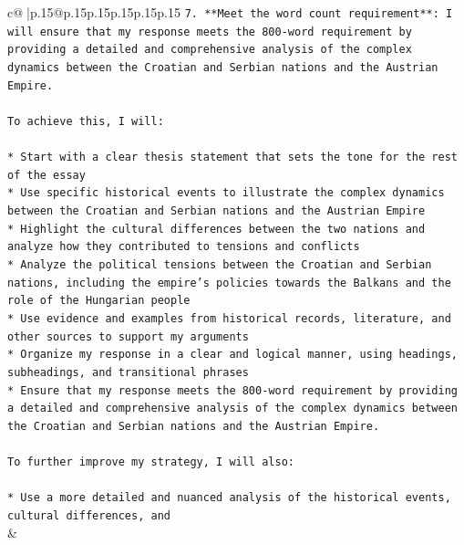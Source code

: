 \documentclass{article}
\begin{document}
{\begin{supertabular}{c@{$\;$}|p{.15\linewidth}@{}p{.15\linewidth}p{.15\linewidth}p{.15\linewidth}p{.15\linewidth}p{.15\linewidth}}
{{{\texttt{7. **Meet the word count requirement**: I will ensure that my response meets the 800{-}word requirement by providing a detailed and comprehensive analysis of the complex dynamics between the Croatian and Serbian nations and the Austrian Empire.} \\
\\ 
\texttt{To achieve this, I will:} \\
\\ 
\texttt{* Start with a clear thesis statement that sets the tone for the rest of the essay} \\
\texttt{* Use specific historical events to illustrate the complex dynamics between the Croatian and Serbian nations and the Austrian Empire} \\
\texttt{* Highlight the cultural differences between the two nations and analyze how they contributed to tensions and conflicts} \\
\texttt{* Analyze the political tensions between the Croatian and Serbian nations, including the empire's policies towards the Balkans and the role of the Hungarian people} \\
\texttt{* Use evidence and examples from historical records, literature, and other sources to support my arguments} \\
\texttt{* Organize my response in a clear and logical manner, using headings, subheadings, and transitional phrases} \\
\texttt{* Ensure that my response meets the 800{-}word requirement by providing a detailed and comprehensive analysis of the complex dynamics between the Croatian and Serbian nations and the Austrian Empire.} \\
\\ 
\texttt{To further improve my strategy, I will also:} \\
\\ 
\texttt{* Use a more detailed and nuanced analysis of the historical events, cultural differences, and} \\
            }
        }
    }
    & \\ \\

\end{supertabular}
}
\end{document}
